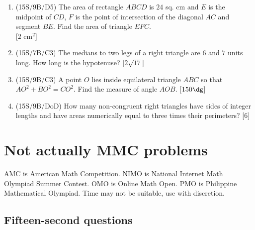 \documentclass[11pt,paper=letter]{scrartcl}
\begin{document}
\begin{enumerate}
\item (15S/9B/D5) The area of rectangle $ABCD$ is $24$ sq. cm and $E$ is the midpoint of $CD$, $F$ is the point of intersection of the diagonal $AC$ and segment $BE$. Find the area of triangle $EFC$. \\ \phantom{.} \hfill [$2 \text{ cm}^2$]

\item (15S/7B/C3) The medians to two legs of a right triangle are $6$ and $7$ units long. How long is the hypotenuse? \hfill [$2\sqrt{17}$]

\item (15S/9B/C3) A point $O$ lies inside equilateral triangle $ABC$ so that $AO^2 + BO^2 = CO^2$. Find the measure of angle $AOB$. \hfill [$150\dg$]

\item (15S/9B/DoD) How many non-congruent right triangles have sides of integer lengths and have areas numerically equal to three times their perimeters? \hfill [$6$]

\end{enumerate}

\section{Not actually MMC problems}

AMC is American Math Competition. NIMO is National Internet Math Olympiad Summer Contest. OMO is Online Math Open. PMO is Philippine Mathematical Olympiad. Time may not be suitable, use with discretion.

\subsection{Fifteen-second questions}
\end{document}
